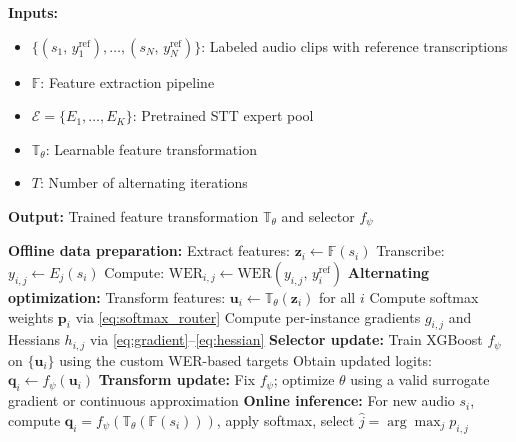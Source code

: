 \documentclass[journal]{IEEEtran}
\begin{document}
    \begin{algorithm}
        [t] \small
        \caption{Offline Training: FASTT for Non-Differentiable Selectors}
        \label{alg:nondiff_training}

        \textbf{Inputs:}
        \begin{itemize}
            \item $\{(s_{1}, \,y_1^{\mathrm{ref}}), \ldots, (s_{N}, \,y_N^{\mathrm{ref}})\}$: Labeled audio
                clips with reference transcriptions

            \item $\mathbb{F}$: Feature extraction pipeline

            \item $\mathcal{E}= \{E_{1}, \ldots, E_{K}\}$: Pretrained STT expert
                pool

            \item $\mathbb{T}_{\theta}$: Learnable feature transformation

            \item $T$: Number of alternating iterations
        \end{itemize}

        \textbf{Output:} Trained feature transformation $\mathbb{T}_{\theta}$ and selector $f_{\psi}$

        \begin{algorithmic}[1]
            \setcounter{ALG@line}{-1}
            \State \textbf{Offline data preparation:} 
            \State Extract features: $\mathbf{z}_{i}\gets \mathbb{F}(s_{i})$
             \State Transcribe:
            $y_{i,j}\gets E_{j}(s_{i})$ \State Compute: $\mathrm{WER}_{i,j}\gets
            \mathrm{WER}(y_{i,j}, \,y_i^{\mathrm{ref}})$ \EndFor \EndFor \State \textbf{Alternating
            optimization:}  \State Transform features:
            $\mathbf{u}_{i}\gets \mathbb{T}_{\theta}(\mathbf{z}_{i})$ for all
            $i$ \State Compute softmax weights $\mathbf{p}_{i}$ via \eqref{eq:softmax_router}
            \State Compute per-instance gradients $g_{i,j}$ and Hessians $h_{i,j}$
            via \eqref{eq:gradient}--\eqref{eq:hessian} \State \textbf{Selector
            update:} Train XGBoost $f_{\psi}$ on $\{\mathbf{u}_{i}\}$ using the custom
            WER-based targets \State Obtain updated logits:
            $\mathbf{q}_{i}\gets f_{\psi}(\mathbf{u}_{i})$ \State \textbf{Transform
            update:} Fix $f_{\psi}$; optimize $\theta$ using a valid surrogate gradient or continuous approximation \EndFor \State \textbf{Online
            inference:} For new audio $s_{i}$, compute
            $\mathbf{q}_{i}= f_{\psi}(\mathbb{T}_{\theta}(\mathbb{F}(s_{i})))$, apply
            softmax, select $\hat{j}= \arg\max_{j}p_{i,j}$
        \end{algorithmic}
    \end{algorithm}
\end{document}
